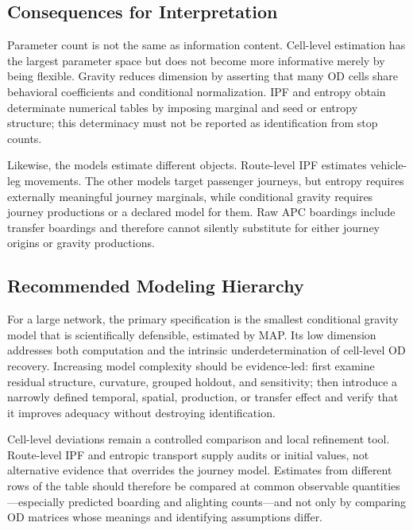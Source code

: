 \subsection{Consequences for Interpretation}

Parameter count is not the same as information content.  Cell-level estimation
has the largest parameter space but does not become more informative merely by
being flexible.  Gravity reduces dimension by asserting that many OD cells
share behavioral coefficients and conditional normalization.  IPF and entropy
obtain determinate numerical tables by imposing marginal and seed or entropy
structure; this determinacy must not be reported as identification from stop
counts.

Likewise, the models estimate different objects.  Route-level IPF estimates
vehicle-leg movements.  The other models target passenger journeys, but
entropy requires externally meaningful journey marginals, while conditional
gravity requires journey productions or a declared model for them.  Raw APC
boardings include transfer boardings and therefore cannot silently substitute
for either journey origins or gravity productions.

\subsection{Recommended Modeling Hierarchy}

For a large network, the primary specification is the smallest conditional
gravity model that is scientifically defensible, estimated by MAP.  Its low
dimension addresses both computation and the intrinsic underdetermination of
cell-level OD recovery.  Increasing model complexity should be evidence-led:
first examine residual structure, curvature, grouped holdout, and sensitivity;
then introduce a narrowly defined temporal, spatial, production, or transfer
effect and verify that it improves adequacy without destroying identification.

Cell-level deviations remain a controlled comparison and local refinement
tool.  Route-level IPF and entropic transport supply audits or initial values,
not alternative evidence that overrides the journey model.  Estimates from
different rows of the table should therefore be compared at common observable
quantities---especially predicted boarding and alighting counts---and not only
by comparing OD matrices whose meanings and identifying assumptions differ.
